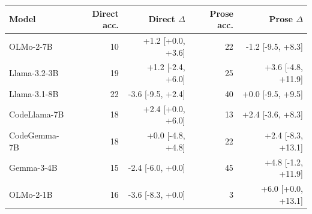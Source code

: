 \begin{tabular}{@{}lrrrr@{}}
\toprule
Model & Direct acc. & Direct $\Delta$ & Prose acc. & Prose $\Delta$ \\
\midrule
OLMo-2-7B & 10 & +1.2 [+0.0, +3.6] & 22 & -1.2 [-9.5, +8.3] \\
Llama-3.2-3B & 19 & +1.2 [-2.4, +6.0] & 25 & +3.6 [-4.8, +11.9] \\
Llama-3.1-8B & 22 & -3.6 [-9.5, +2.4] & 40 & +0.0 [-9.5, +9.5] \\
CodeLlama-7B & 18 & +2.4 [+0.0, +6.0] & 13 & +2.4 [-3.6, +8.3] \\
CodeGemma-7B & 18 & +0.0 [-4.8, +4.8] & 22 & +2.4 [-8.3, +13.1] \\
Gemma-3-4B & 15 & -2.4 [-6.0, +0.0] & 45 & +4.8 [-1.2, +11.9] \\
OLMo-2-1B & 16 & -3.6 [-8.3, +0.0] & 3 & +6.0 [+0.0, +13.1] \\
\bottomrule
\end{tabular}
